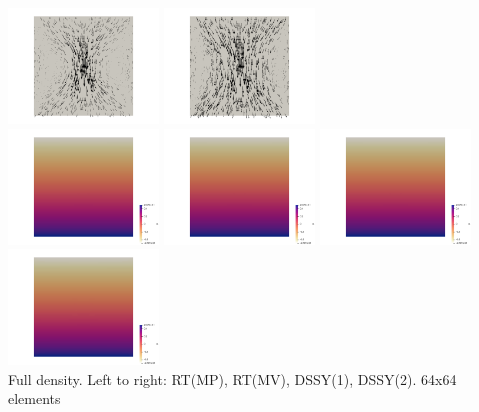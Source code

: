 \begin{center}
\includegraphics[width=4cm]{python_codes/fieldstone_77/results/block/full/vels3}
\includegraphics[width=4cm]{python_codes/fieldstone_77/results/block/full/vels4}\\
\includegraphics[width=4cm]{python_codes/fieldstone_77/results/block/full/press1}
\includegraphics[width=4cm]{python_codes/fieldstone_77/results/block/full/press2}
\includegraphics[width=4cm]{python_codes/fieldstone_77/results/block/full/press3}
\includegraphics[width=4cm]{python_codes/fieldstone_77/results/block/full/press4}\\
{\captionfont Full density. Left to right: RT(MP), RT(MV), DSSY(1), DSSY(2). 64x64 elements}
\end{center}

